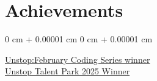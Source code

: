 \documentclass[12pt, a3paper]{article}
\newenvironment{highlightsforbulletentries}{
    \begin{itemize}[
        topsep=0.10 cm,
        parsep=0.10 cm,
        partopsep=0pt,
        itemsep=0pt,
        leftmargin=10pt
    ]
}{
    \end{itemize}
} %
\newenvironment{onecolentry}{
    \begin{adjustwidth}{
        0 cm + 0.00001 cm
    }{
        0 cm + 0.00001 cm
    }
}{
    \end{adjustwidth}
} %
\begin{document}
        \section{Achievements}

        \begin{onecolentry}
            \begin{highlightsforbulletentries}
                \href{https://unstop.com/certificate-preview/a2c45722-20b1-4708-81ba-74b1874823f1}{Unstop:February Coding Series winner} \\
                 \href{https://unstop.com/certificate-preview/a2c45722-20b1-4708-81ba-74b1874823f1}{ Unstop Talent Park 2025 Winner}
           
    
            \end{highlightsforbulletentries}
        \end{onecolentry}

    
\end{document}
